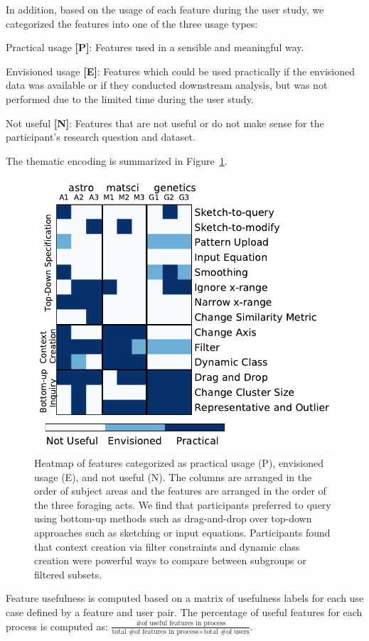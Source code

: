 \npar In addition, based on the usage of each feature during the user study, we categorized the features into one of the three usage types:
\begin{denselist}
    \item Practical usage \textbf{[P]}: Features used in a sensible and meaningful way.
    \item Envisioned usage \textbf{[E]}: Features which could be used practically if the envisioned data was available or if they conducted downstream analysis, but was not performed due to the limited time during the user study.
    \item Not useful \textbf{[N]}: Features that are not useful or do not make sense for the participant's research question and dataset.
\end{denselist}
The thematic encoding is summarized in Figure~\ref{feature_heatmap}.
\begin{figure}[ht!]
    \centering
    \includegraphics[width=0.75\columnwidth]{figures/PENcoding.pdf}
    \vspace{-6pt}\caption{Heatmap of features categorized as practical usage (P), envisioned usage (E), and not useful (N). The columns are arranged in the order of subject areas and the features are arranged in the order of the three foraging acts. We find that participants preferred to query using bottom-up methods such as drag-and-drop over top-down approaches such as sketching or input equations. Participants found that context creation via filter constraints and dynamic class creation were powerful ways to compare between subgroups or filtered subsets.}
    \label{feature_heatmap}
    \vspace{-5pt}
\end{figure}
Feature usefulness is computed based on a matrix of usefulness labels for each use case defined by a feature and user pair. The percentage of useful features for each process is computed as: $\frac{\textrm{\# of useful features in process}}{\textrm{total \# of features in process} \times \textrm{total \# of users}}$.
